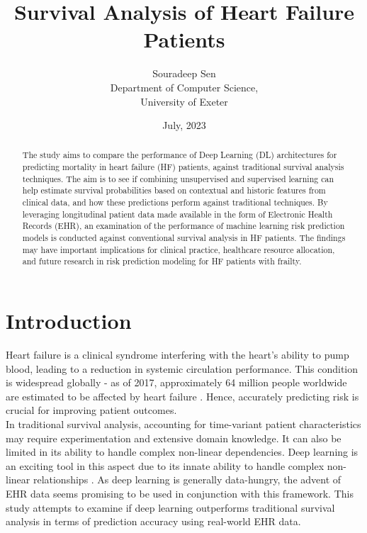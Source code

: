 \documentclass[%
 reprint,
 amsmath,amssymb,
 aps,nofootinbib
]{revtex4-2}
\begin{document}


\title{Survival Analysis of Heart Failure Patients}%
\author{Souradeep Sen \\
	 \small Department of Computer Science, \\ 
	 \small University of Exeter
	}

\date{July, 2023}%

\begin{abstract}
The study aims to compare the performance of Deep Learning (DL) architectures for predicting mortality in heart failure (HF) patients, against traditional survival analysis techniques. The aim is to see if combining unsupervised and supervised learning can help estimate survival probabilities based on contextual and historic features from clinical data, and how these predictions perform against traditional techniques. By leveraging longitudinal patient data made available in the form of Electronic Health Records (EHR), an examination of the performance of machine learning risk prediction models is conducted against conventional survival analysis in HF patients. The findings may have important implications for clinical practice, healthcare resource allocation, and future research in risk prediction modeling for HF patients with frailty.
\end{abstract}

\maketitle

\section{\label{intro}Introduction}
Heart failure is a clinical syndrome interfering with the heart's ability to pump blood, leading to a reduction in systemic circulation performance. This condition is widespread globally - as of 2017, approximately 64 million people worldwide are estimated to be affected by heart failure \cite{hf_prevalence}. Hence, accurately predicting risk is crucial for improving patient outcomes.\\

In traditional survival analysis, accounting for time-variant patient characteristics may require experimentation and extensive domain knowledge. It can also be limited in its ability to handle complex non-linear dependencies. Deep learning is an exciting tool in this aspect due to its innate ability to handle complex non-linear relationships \cite{Cybenko_1992}. As deep learning is generally data-hungry, the advent of EHR data seems promising to be used in conjunction with this framework. This study attempts to examine if deep learning outperforms traditional survival analysis in terms of prediction accuracy using real-world EHR data.\\
\end{document}
